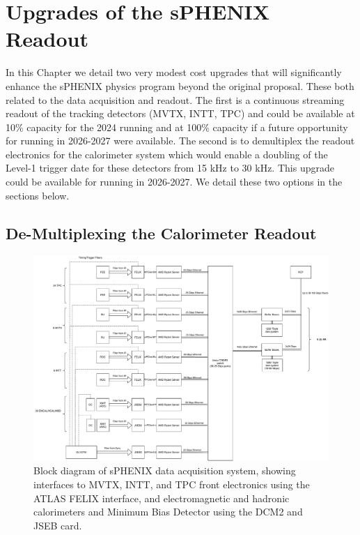 \chapter{Upgrades of the sPHENIX Readout}
\label{chap:readout}

In this Chapter we detail two very modest cost upgrades that will significantly enhance the sPHENIX physics program beyond the original proposal.     These both related to the data acquisition and readout.   The first is a continuous streaming readout of the tracking detectors (MVTX, INTT, TPC) and could be available at 10\% capacity for the 2024 running and at 100\% capacity if a future opportunity for running in 2026-2027 were available.   The second is to demultiplex the readout electronics for the calorimeter system which would enable a doubling of the Level-1 trigger date for these detectors from 15 kHz to 30 kHz.   This upgrade could be available for running in 2026-2027.   We detail these two options in the sections below.



\section{De-Multiplexing the Calorimeter Readout}
\label{sec:streaming_readout}

\begin{figure}
    \centering
    \includegraphics[width=0.75\linewidth]{figs/sphenixdaq_servers_20200803.pdf}
    \caption{Block diagram of sPHENIX data acquisition system, showing interfaces to MVTX,
    INTT, and TPC front electronics using the ATLAS FELIX interface, and electromagnetic and hadronic calorimeters and Minimum Bias Detector using the DCM2 and JSEB card.}
    \label{fig:sphenixdaq_servers}
\end{figure}

